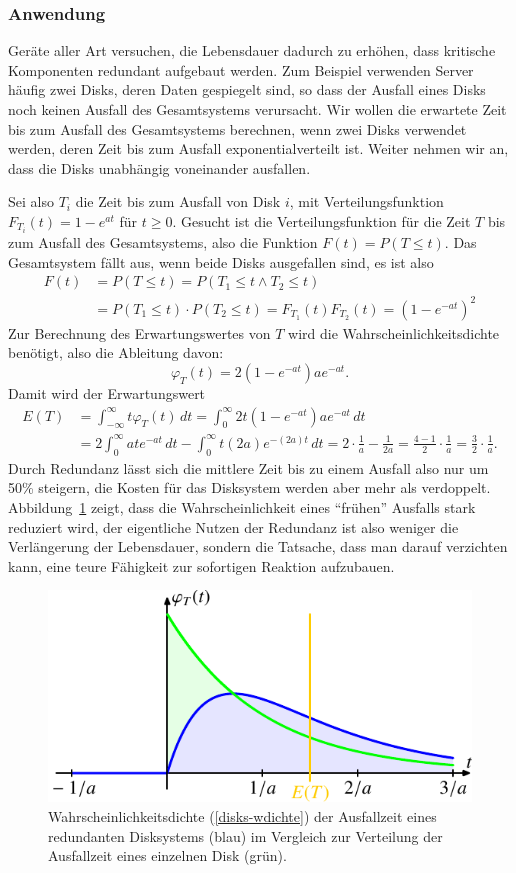 \subsubsection{Anwendung}
Geräte aller Art versuchen, die Lebensdauer dadurch zu erhöhen, dass
kritische Komponenten redundant aufgebaut werden.
Zum Beispiel verwenden Server häufig zwei Disks, deren Daten
gespiegelt sind, so dass der Ausfall eines Disks noch keinen Ausfall
des Gesamtsystems verursacht.
Wir wollen die erwartete Zeit bis zum
Ausfall des Gesamtsystems berechnen, wenn zwei Disks verwendet werden,
deren Zeit bis zum Ausfall exponentialverteilt ist.
Weiter nehmen
wir an, dass die Disks unabhängig voneinander ausfallen.

Sei also $T_i$ die Zeit bis zum Ausfall von Disk $i$, mit
Verteilungsfunktion $F_{T_i}(t)=1-e^{at}$ für $t\ge 0$.
Gesucht
ist die Verteilungsfunktion für die Zeit $T$ bis zum Ausfall
des Gesamtsystems, also die Funktion $F(t)=P(T\le t)$.
Das Gesamtsystem
fällt aus, wenn beide Disks ausgefallen sind, es ist also
\begin{align*}
F(t)
&=P(T\le t)=P(T_1\le t\wedge T_2\le t)\\
&=P(T_1\le t)\cdot P(T_2\le t)
= F_{T_1}(t) F_{T_2}(t)=(1-e^{-at})^2
\end{align*}
Zur Berechnung des Erwartungswertes von $T$ wird die
Wahrscheinlichkeitsdichte benötigt, also die Ableitung davon:
\begin{equation}
\varphi_{T}(t)=2(1-e^{-at})ae^{-at}.
\label{disks-wdichte}
\end{equation}
Damit wird der Erwartungswert
\begin{align*}
E(T)
&=
\int_{-\infty}^{\infty}t\varphi_T(t)\,dt
=\int_0^\infty 2t(1-e^{-at})ae^{-at}\,dt
\\
&=2\int_0^\infty ate^{-at}\,dt - \int_0^\infty t (2a)e^{-(2a)t}\,dt
=2\cdot\frac1a-\frac1{2a}=\frac{4-1}2\cdot\frac1a=\frac32\cdot\frac1a.
\end{align*}
Durch Redundanz lässt sich die mittlere Zeit bis zu einem Ausfall
also nur um 50\% steigern, die Kosten für das Disksystem werden
aber mehr als verdoppelt.
Abbildung~\ref{graph:disksystem} zeigt, dass die Wahrscheinlichkeit
eines ``frühen'' Ausfalls stark reduziert wird, der eigentliche
Nutzen der Redundanz ist also weniger die Verlängerung der 
Lebensdauer, sondern die Tatsache, dass man darauf verzichten kann,
eine teure Fähigkeit zur sofortigen Reaktion aufzubauen.
\begin{figure}
\centering
\includegraphics{images/exp-3.pdf}
\caption{Wahrscheinlichkeitsdichte (\ref{disks-wdichte}) 
der Ausfallzeit eines redundanten Disksystems (blau)
im Vergleich zur Verteilung der Ausfallzeit eines einzelnen Disk (grün).
\label{graph:disksystem}}
\end{figure}

